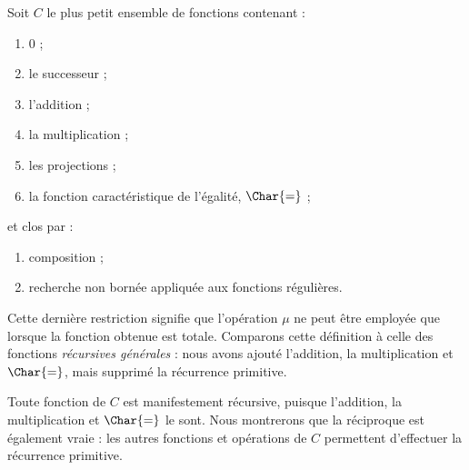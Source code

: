 \documentclass[../../../include/open-logic-section]{subfiles}
\begin{document}

Soit $C$ le plus petit ensemble de fonctions contenant :
\begin{enumerate}
\item $0$ ;
\item le successeur ;
\item l'addition ;
\item la multiplication ;
\item les projections ;
\item la fonction caractéristique de l'égalité, $\Char{=}$ ;
\end{enumerate}
et clos par :
\begin{enumerate}
\item composition ;
\item recherche non bornée appliquée aux fonctions régulières.
\end{enumerate}
Cette dernière restriction signifie que l'opération $\mu$
ne peut être employée que lorsque la fonction obtenue est
totale. Comparons cette définition à celle des fonctions
\emph{récursives générales} : nous avons ajouté l'addition,
la multiplication et $\Char{=}$, mais supprimé la récurrence
primitive.

Toute fonction de $C$ est manifestement récursive, puisque
l'addition, la multiplication et $\Char{=}$ le sont.
Nous montrerons que la réciproque est également vraie :
les autres fonctions et opérations de $C$ permettent
d'effectuer la récurrence primitive.
\end{document}
